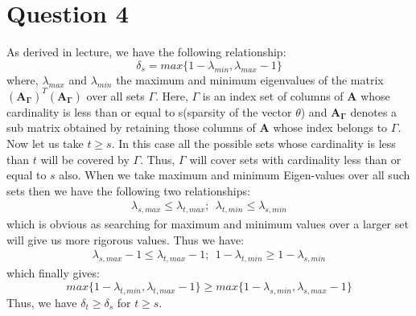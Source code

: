 \documentclass[12pt]{article}
\begin{document}
\section*{Question 4}
As derived in lecture, we have the following relationship:
\begin{equation*}
    \delta_s = max\{1-\lambda_{min}, \lambda_{max}-1\}
\end{equation*}
where, $\lambda_{max}$ and $\lambda_{min}$ the maximum and minimum eigenvalues of the matrix
$(\boldsymbol{A_{\Gamma}})^T(\boldsymbol{A_{\Gamma}})$ over all sets $\Gamma$. Here, $\Gamma$ is an index set of columns of $\boldsymbol{A}$ whose cardinality is less than or equal to s(sparsity of the vector $\theta$) and $\boldsymbol{A_{\Gamma}}$ denotes a sub matrix obtained by retaining those columns of $\boldsymbol{A}$ whose index belongs to $\Gamma$. \\
Now let us take $t\geq s$. In this case all the possible sets whose cardinality is less than $t$ will be covered by $\Gamma$. Thus, $\Gamma$ will cover sets with cardinality less than or equal to $s$ also. When we take maximum and minimum Eigen-values over all such sets then we have the following two relationships:
\begin{align*}
    \lambda_{s, max} \leq \lambda_{t, max}; \ \ \lambda_{t, min} \leq \lambda_{s, min}
\end{align*}
which is obvious as searching for maximum and minimum values over a larger set will give us more rigorous values. Thus we have:
\begin{align*}
    \lambda_{s, max}-1 \leq \lambda_{t, max}-1; \ \ 1-\lambda_{t, min} \geq 1-\lambda_{s, min}
\end{align*}
which finally gives:
\begin{equation*}
    max\{1-\lambda_{t, min}, \lambda_{t, max}-1\} \geq max\{1-\lambda_{s, min}, \lambda_{s, max}-1\}
\end{equation*}
Thus, we have $\delta_t \geq \delta_s$ for $t \geq s$.
\end{document}
